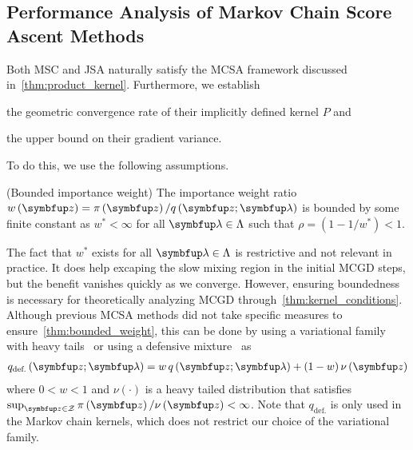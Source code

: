 
%
%


\vspace{-0.05in}
\subsection{Performance Analysis of Markov Chain Score Ascent Methods}\label{section:comparison}
\vspace{-0.05in}
Both MSC and JSA naturally satisfy the MCSA framework discussed in~\cref{thm:product_kernel}.
Furthermore, we establish 
\begin{enumerate*}[label=\textbf{(\roman*)}]
  \item the geometric convergence rate of their implicitly defined kernel \(P\) and
  \item the upper bound on their gradient variance.
\end{enumerate*}
To do this, we use the following assumptions.
\begin{assumption}{(Bounded importance weight)}\label{thm:bounded_weight}
  The importance weight ratio \(w\left(\vz\right) = \pi\left(\vz\right) / q\left(\vz; \vlambda\right)\) is bounded by some finite constant as \(w^* < \infty\) for all \(\vlambda \in \Lambda\) such that \(\rho = \left(1 - 1/w^*\right) < 1\).
\end{assumption}
\vspace{-0.05in}
The fact that \(w^*\) exists for all \(\vlambda \in \Lambda\) is restrictive and not relevant in practice.
It does help excaping the slow mixing region in the initial MCGD steps, but the benefit vanishes quickly as we converge.
However, ensuring boundedness is necessary for theoretically analyzing MCGD through~\cref{thm:kernel_conditions}.
Although previous MCSA methods did not take specific measures to ensure~\cref{thm:bounded_weight}, this can be done by using a variational family with heavy tails~\citep{NEURIPS2018_25db67c5} or using a defensive mixture~\citep{hesterberg_weighted_1995, holden_adaptive_2009} as
\vspace{-0.05in}
\begin{align*}
  q_{\text{def.}}\left(\vz; \vlambda \right) = w \, q\left(\vz; \vlambda\right) + (1 - w) \, \nu\left(\vz\right)
\end{align*}
where \(0 < w < 1\) and \(\nu\left(\cdot\right)\) is a heavy tailed distribution that satisfies \(\sup_{\vz \in \mathcal{Z}} \pi\left(\vz\right) / \nu\left(\vz\right) < \infty\).
Note that \(q_{\text{def.}}\) is only used in the Markov chain kernels, which does not restrict our choice of the variational family.

